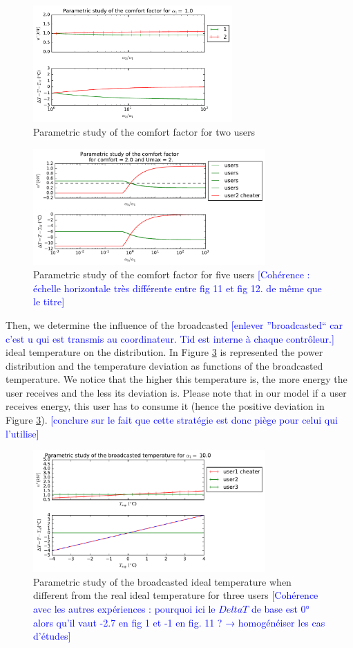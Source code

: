\documentclass[conference]{IEEEtran}
\newcommand{\rem}[1]{\textcolor{blue}{[#1]}}
\begin{document}
\begin{figure}[H]
\centering
\includegraphics[width=3in]{statcht2alpZ.pdf}
\caption{Parametric study of the comfort factor for two users}
\label{SCHT_a2}
\end{figure}

\begin{figure}[H]
\centering
\includegraphics[width=3.5in]{statcht5alp.pdf}
\caption{Parametric study of the comfort factor for five users
\rem{Cohérence : échelle horizontale très différente entre fig 11 et fig 12. de même que le titre}
}
\label{SCHT_a5}
\end{figure}

Then, we determine the influence of the broadcasted
\rem{enlever ''broadcasted`` car c'est u qui est transmis au coordinateur. Tid est interne à chaque contrôleur.}
ideal temperature on the distribution. In Figure \ref{SCHT_T} is represented the power distribution and the temperature deviation as functions of the broadcasted temperature. We notice that the higher this temperature is, the more energy the user receives and the less its deviation is. Please note that in our model if a user receives energy, this user has to consume it (hence the positive deviation in Figure \ref{SCHT_T}).
\rem{conclure sur le fait que cette stratégie est donc piège pour celui qui l'utilise}

\begin{figure}[H]
\centering
\includegraphics[width=3.5in]{statchtbcT.pdf}
\caption{Parametric study of the broadcasted ideal temperature when different from the real ideal temperature for three users
\rem{Cohérence avec les autres expériences : pourquoi ici le $Delta T$ de base est 0° alors qu'il vaut -2.7 en fig 1 et -1 en fig. 11 ? → homogénéiser les cas d'études}
}
\label{SCHT_T}
\end{figure}
\end{document}
